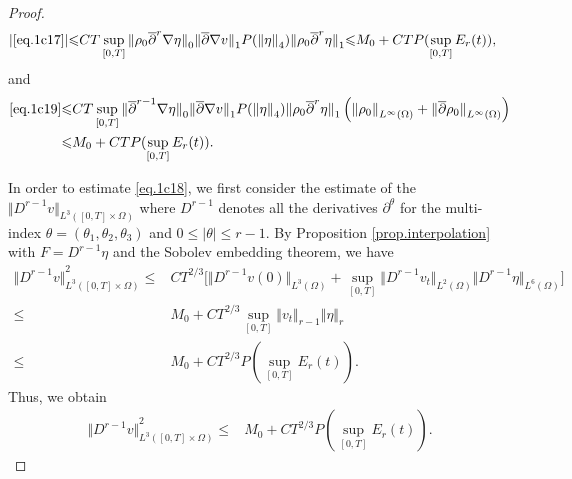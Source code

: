 \documentclass[12pt,twoside,reqno]{amsart}
\numberwithin{equation}{section}
\theoremstyle{definition}
\theoremstyle{remark}
\begin{document}
\begin{proof}
\begin{align*}
  {\vert{\eqref{eq.1c17}}\vert}{\leqslant}& CT\sup_{[0,T]} {\Vert{{\rho_0} {\overline{\partial}}^r{\nabla}\eta}\Vert}_0{\Vert{{\overline{\partial}}{\nabla} v }\Vert}_1P({\Vert{\eta}\Vert}_4){\Vert{{\rho_0} {\overline{\partial}}^r\eta}\Vert}_1 {\leqslant} M_0+CTP(\sup_{[0,T]}E_r(t)),
\end{align*}
and
\begin{align*}
  \eqref{eq.1c19}{\leqslant}& CT\sup_{[0,T]} {\Vert{{\overline{\partial}}^{r-1}{\nabla}\eta}\Vert}_0{\Vert{{\overline{\partial}}{\nabla} v }\Vert}_1P({\Vert{\eta}\Vert}_4){\Vert{{\rho_0} {\overline{\partial}}^r\eta}\Vert}_1 \left({\Vert{\rho_0}\Vert}_{L^\infty(\Omega)}+{\Vert{{\overline{\partial}} {\rho_0} }\Vert}_{L^\infty(\Omega)}\right)\\
   {\leqslant}& M_0+CTP(\sup_{[0,T]}E_r(t)).
\end{align*}

In order to estimate \eqref{eq.1c18}, we first consider the estimate of the ${\Vert{D^{r-1} v}\Vert}_{L^3([0,T]\times\Omega)}$ where $D^{r-1}$ denotes all the derivatives ${\partial}^{\theta}$ for the multi-index $\theta=(\theta_1,\theta_2,\theta_3)$ and $0{\leqslant}{\vert{\theta}\vert}{\leqslant} r-1$. By Proposition \ref{prop.interpolation} with $F=D^{r-1}\eta$ and the Sobolev embedding theorem, we have
\begin{align*}
  {\Vert{D^{r-1} v}\Vert}_{L^3([0,T]\times\Omega)}^2
  {\leqslant} &CT^{2/3}\Big[{\Vert{D^{r-1}v(0)}\Vert}_{L^3(\Omega)}+\sup_{[0,T]}{\Vert{D^{r-1}v_t}\Vert}_{L^2(\Omega)} {\Vert{D^{r-1}\eta}\Vert}_{L^6(\Omega)}\Big]\\
  {\leqslant}&M_0+CT^{2/3}\sup_{[0,T]}{\Vert{v_t}\Vert}_{r-1}{\Vert{\eta}\Vert}_r\\
  {\leqslant} &M_0+CT^{2/3}P(\sup_{[0,T]}E_r(t)).
\end{align*}
Thus, we obtain
\begin{align}\label{eq.vL3est}
  {\Vert{D^{r-1} v}\Vert}_{L^3([0,T]\times\Omega)}^2{\leqslant} &M_0+CT^{2/3}P(\sup_{[0,T]}E_r(t)).
\end{align}


\end{proof}
\end{document}

